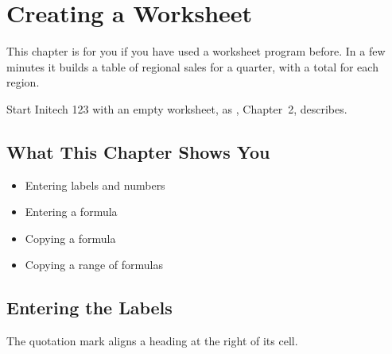 \chapter{Creating a Worksheet}

This chapter is for you if you have used a worksheet program before.  In a
few minutes it builds a table of regional sales for a quarter, with a
total for each region.

\begin{Note}
Start Initech 123 with an empty worksheet, as , Chapter~2, describes.
\end{Note}

\section{What This Chapter Shows You}
\begin{itemize}
\item Entering labels and numbers
\item Entering a formula
\item Copying a formula
\item Copying a range of formulas
\end{itemize}

\section{Entering the Labels}
\begin{Keystrokes}
\end{Keystrokes}
The quotation mark aligns a heading at the right of its cell.

